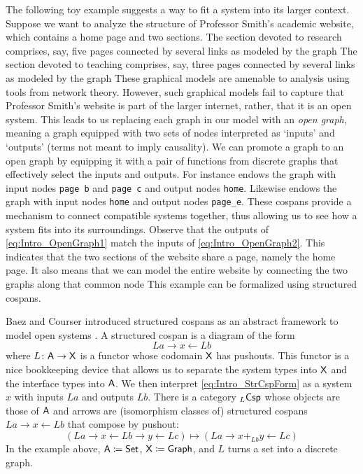 \documentclass{amsart}
\begin{document}
The following toy example suggests a way to fit a system
into its larger context. Suppose we want to analyze the
structure of Professor Smith's academic website, which
contains a home page and two sections. The section devoted
to research comprises, say, five pages connected by several
links as modeled by the graph
 The section devoted to
teaching comprises, say, three pages connected by several
links as modeled by the graph
 These graphical models
are amenable to analysis using tools from network
theory. However, such graphical models fail to capture that
Professor Smith's website is part of the larger internet,
rather, that it is an open system. This leads to us
replacing each graph in our model with an \emph{open graph},
meaning a graph equipped with two sets of nodes interpreted
as `inputs' and `outputs' (terms not meant to imply
causality). We can promote a graph to an open graph by
equipping it with a pair of functions from discrete graphs
that effectively select the inputs and outputs. For instance
 endows the graph with
input nodes \texttt{page b} and \texttt{page c} and output
nodes \texttt{home}. Likewise
 endows the graph with
input nodes \texttt{home} and output nodes \texttt{page\_e}.
These cospans provide a mechanism to connect compatible
systems together, thus allowing us to see how a system fits
into its surroundings. Observe that the outputs of
\eqref{eq:Intro_OpenGraph1} match the inputs of
\eqref{eq:Intro_OpenGraph2}. This indicates that the two
sections of the website share a page, namely the home page.
It also means that we can model the entire website by
connecting the two graphs along that common node
 This example can be
formalized using structured cospans.

Baez and Courser introduced structured cospans as
an abstract framework to model open systems
\cite{bc_strCsp}. A structured cospan is a diagram
of the form
\begin{equation}\label{eq:Intro_StrCspForm}
  La \to x \gets Lb
\end{equation}
where $ L \colon \mathsf{A} \to \mathsf{X} $ is a functor whose
codomain $ \mathsf{X} $ has pushouts. This functor is a
nice bookkeeping device that allows us to separate
the system types into $ \mathsf{X} $ and the interface
types into $ \mathsf{A} $.  We then interpret
\eqref{eq:Intro_StrCspForm} as a system $ x $ with
inputs $ La $ and outputs $ Lb $. There is a
category $ _L\mathsf{Csp} $ whose objects are those of
$ \mathsf{A} $ and arrows are (isomorphism classes of) structured cospans
$ La \to x \gets Lb $ that compose by pushout:
$$(La \to x \gets Lb \to y \gets Lc) \mapsto (La \to x +_{Lb}y
\gets Lc)$$ In the example above,
$ \mathsf{A} \coloneqq \mathsf{Set} $, $ \mathsf{X} \coloneqq \mathsf{Graph} $, and
$ L $ turns a set into a discrete graph.
\end{document}
